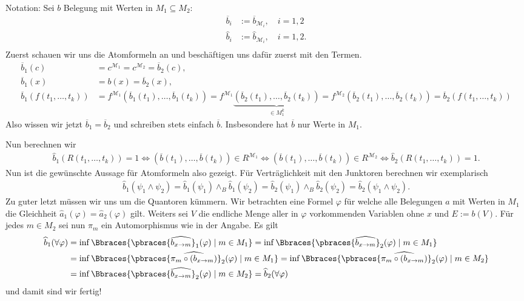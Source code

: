 \begin{solution}
	Notation: Sei $b$ Belegung mit Werten in $M_1 \subseteq M_2$:
	\begin{align*}
	\overline{b}_i &:= \overline{b}_{\mathscr{M}_i}, \quad i = 1,2 \\
	\hat{b}_i &:= \hat{b}_{\mathscr{M}_i}, \quad i = 1,2. \\
	\end{align*}
	Zuerst schauen wir uns die Atomformeln an und beschäftigen uns dafür zuerst mit den Termen.
	\begin{align*}
	\overline{b}_1(c) &= c^{\mathscr{M}_1} = c^{\mathscr{M}_2} = \overline{b}_2(c), \\
	\overline{b}_1(x) &= b(x) = \overline{b}_2(x), \\
	\overline{b}_1(f(t_1, \dots, t_k)) &= f^{\mathscr{M}_1}(\overline{b}_1(t_1), \dots, \overline{b}_1(t_k))
	= f^{\mathscr{M}_1}\underbrace{(\overline{b}_2(t_1), \dots, \overline{b}_2(t_k))}_{\in M_1^k} =
	f^{\mathscr{M}_2}(\overline{b}_2(t_1), \dots, \overline{b}_2(t_k))
	= \overline{b}_2(f(t_1, \dots, t_k))
	\end{align*}
	Also wissen wir jetzt $\overline{b}_1 = \overline{b}_2$ und schreiben stets einfach $\overline{b}$. Insbesondere hat $\overline{b}$ nur Werte in $M_1$. 
	
	Nun berechnen wir
	\begin{align*}
	\widehat{b}_1(R(t_1, \dots, t_k)) = 1 \Leftrightarrow (\overline{b}(t_1), \dots, \overline{b}(t_k)) \in R^{\mathscr{M}_1} \Leftrightarrow  (\overline{b}(t_1), \dots, \overline{b}(t_k)) \in R^{\mathscr{M}_2} \Leftrightarrow \widehat{b}_2(R(t_1, \dots, t_k)) = 1.
	\end{align*}
	Nun ist die gewünschte Aussage für Atomformeln also gezeigt. Für Verträglichkeit mit den Junktoren berechnen wir exemplarisch
	\begin{align*}
	\widehat{b}_1(\psi_1 \land \psi_2) = \widehat{b}_1(\psi_1) \land_B \widehat{b}_1 (\psi_2) = \widehat{b}_2(\psi_1) \land_B \widehat{b}_2(\psi_2) = \widehat{b}_2(\psi_1 \land \psi_2).
	\end{align*}
	Zu guter letzt müssen wir uns um die Quantoren kümmern. Wir betrachten eine Formel $\varphi$ für welche alle Belegungen $a$ mit Werten in $M_1$ die Gleichheit $\hat{a}_1(\varphi) = \hat{a}_2(\varphi)$ gilt. Weiters sei $V$ die endliche Menge aller in $\varphi$ vorkommenden Variablen ohne $x$ und $E := b(V)$. Für jedes $m \in M_2$ sei nun $\pi_m$ ein Automorphismus wie in der Angabe. Es gilt
	\begin{align*}
	\widehat{b}_1(\forall \varphi) &= \inf\Bbraces{\pbraces{\widehat{b_{x \to  m}}}_1(\varphi) \mid m \in M_1} = \inf\Bbraces{\pbraces{\widehat{b_{x \to  m}}}_2(\varphi) \mid m \in M_1} \\
	&= \inf\Bbraces{\pbraces{\widehat{\pi_m \circ (b_{x \to  m})}}_2(\varphi) \mid m \in M_1} = \inf\Bbraces{\pbraces{\widehat{\pi_m \circ (b_{x \to  m})}}_2(\varphi) \mid m \in M_2} \\
	&= \inf\Bbraces{\pbraces{\widehat{b_{x \to  m}}}_2(\varphi) \mid m \in M_2} = \widehat{b}_2(\forall \varphi)
	\end{align*}
	und damit sind wir fertig!
\end{solution}
